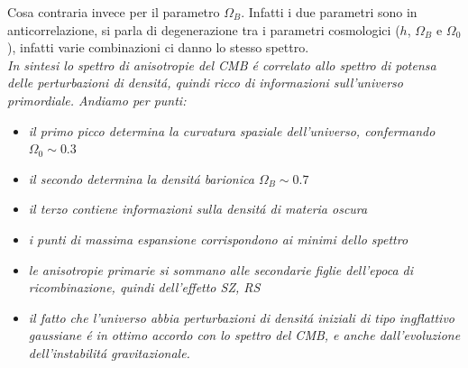 \documentclass[12pt, a4paper]{article}
\begin{document}
Cosa contraria invece per il parametro $\Omega_B$. Infatti i due parametri sono in anticorrelazione, si parla di degenerazione tra i parametri cosmologici ($h$, $\Omega_B$ e $\Omega_0$), infatti varie combinazioni ci danno lo stesso spettro.\\
\textit{In sintesi lo spettro di anisotropie del CMB \'{e} correlato allo spettro di potensa delle perturbazioni di densit\'{a}, quindi ricco di informazioni sull'universo primordiale. Andiamo per punti:}
\begin{itemize}
\item \textit{il primo picco determina la curvatura spaziale dell'universo, confermando $\Omega_0\sim 0.3$}
\item \textit{il secondo determina la densit\'{a} barionica $\Omega_B\sim 0.7$}
\item \textit{il terzo contiene informazioni sulla densit\'{a} di materia oscura}
\item \textit{i punti di massima espansione corrispondono ai minimi dello spettro}
\item \textit{le anisotropie primarie si sommano alle secondarie figlie dell'epoca di ricombinazione, quindi dell'effetto SZ, RS}
\item \textit{il fatto che l'universo abbia perturbazioni di densit\'{a} iniziali di tipo ingflattivo gaussiane \'{e } in ottimo accordo con lo spettro del CMB, e anche dall'evoluzione dell'instabilit\'{a} gravitazionale.}
\end{itemize}
\end{document}
